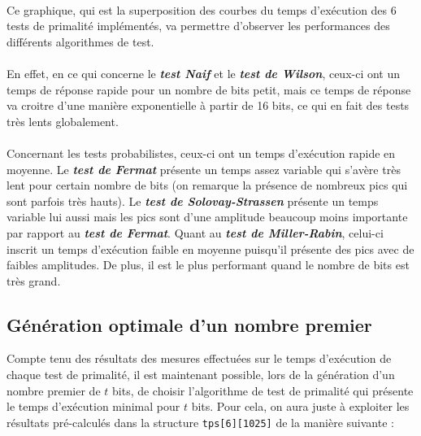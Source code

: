 			\paragraph{} Ce graphique, qui est la superposition des courbes du temps d'exécution des 6 tests de primalité implémentés, va permettre d'observer les performances des différents algorithmes de test.
			\paragraph{} En effet, en ce qui concerne le \textit{\textbf{test Naif}} et le \textit{\textbf{test de Wilson}}, ceux-ci ont un temps de réponse rapide pour un nombre de bits petit, mais ce temps de réponse va croitre d'une manière exponentielle à partir de 16 bits, ce qui en fait des tests très lents globalement.
			\paragraph{} Concernant les tests probabilistes, ceux-ci ont un temps d'exécution rapide en moyenne. Le \textit{\textbf{test de Fermat}} présente un temps assez variable qui s'avère très lent pour certain nombre de bits (on remarque la présence de nombreux pics qui sont parfois très hauts). Le \textit{\textbf{test de Solovay-Strassen}} présente un temps variable lui aussi mais les pics sont d'une amplitude beaucoup moins importante par rapport au \textit{\textbf{test de Fermat}}. Quant au \textit{\textbf{test de Miller-Rabin}}, celui-ci inscrit un temps d'exécution faible en moyenne puisqu'il présente des pics avec de faibles amplitudes. De plus, il est le plus performant quand le nombre de bits est très grand.
		
		
		
	\subsection{Génération optimale d'un nombre premier}
		Compte tenu des résultats des mesures effectuées sur le temps d'exécution de chaque test de primalité, il est maintenant possible, lors de la génération d'un nombre premier de $t$ bits, de choisir l'algorithme de test de primalité qui présente le temps d'exécution minimal pour $t$ bits. Pour cela, on aura juste à exploiter les résultats pré-calculés dans la structure \lstinline!tps[6][1025]! de la manière suivante :\\
			
